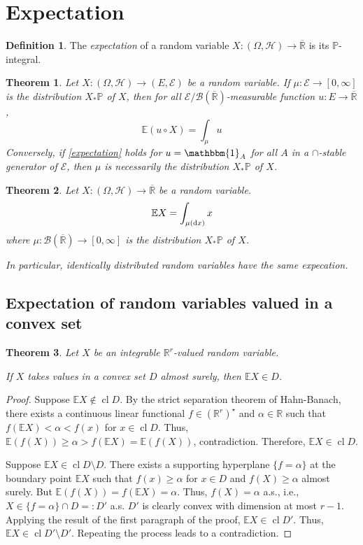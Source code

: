 \documentclass[11pt, a4paper, openany]{book}
\newtheorem{thm}{Theorem}\newtheorem{lem}{Lemma}\newtheorem{crl}{Corollary}
\theoremstyle{definition}
\newtheorem{define}{Definition}\newtheorem{exam}{Example}\newtheorem{remark}{Remark}
\DeclareMathOperator{\cl}{cl}
\newcommand{\er}{\overline{\mathbb{R}}}
\begin{document}
\section{Expectation}
    \begin{define}
        The \textit{expectation} of a random variable $X:(\Omega,\mathscr{H})\rightarrow\er$ is its $\mathbb{P}$-integral.
    \end{define}
    \begin{thm}
        Let $X:(\Omega,\mathscr{H})\rightarrow (E,\mathscr{E})$ be a random variable. If $\mu:\mathscr{E}\rightarrow [0,\infty]$ is the distribution $X_*\mathbb{P}$ of $X$, then for all $\mathscr{E}/\mathscr{B}(\er)$-measurable function $u:E\rightarrow \er$,
        \begin{equation}\label{expectation}
            \mathbb{E}(u\circ X)=\int_{\mu}u
        \end{equation}
        Conversely, if \eqref{expectation} holds for $u=\mathbbm{1}_A$ for all $A$ in a $\cap$-stable generator of $\mathscr{E}$, then $\mu$ is necessarily the distribution $X_*\mathbb{P}$ of $X$.
    \end{thm}
    \begin{thm}
        Let $X:(\Omega,\mathscr{H})\rightarrow \er$ be a random variable.
        \[
            \mathbb{E} X=\int_{\mu(\odif x)}x
        \]
        where $\mu:\mathscr{B}(\er)\rightarrow [0,\infty]$ is the distribution $X_*\mathbb{P}$ of $X$.

        In particular, identically distributed random variables have the same expecation.
    \end{thm}
\subsection{Expectation of random variables valued in a convex set}
    \begin{thm}\label{expectation of random variables valued in a convex set}
        Let $X$ be an integrable $\mathbb{R}^r$-valued random variable.

        If $X$ takes values in a convex set $D$ almost surely, then $\mathbb{E}X\in D$.
    \end{thm}
    \begin{proof}
        Suppose $\mathbb{E}X\notin \cl D$. By the strict separation theorem of Hahn-Banach, there exists a continuous linear functional $f\in(\mathbb{R}^r)^\star$ and $\alpha\in\mathbb{R}$ such that $f(\mathbb{E}X)<\alpha<f(x)$ for $x\in \cl D$. Thus, $\mathbb{E}(f(X))\geqslant \alpha>f(\mathbb{E}X)=\mathbb{E}(f(X))$, contradiction. Therefore, $\mathbb{E}X\in \cl D$.

        Suppose $\mathbb{E}X\in \cl D\setminus D$. There exists a supporting hyperplane $\{f=\alpha\}$ at the boundary point $\mathbb{E}X$ such that $f(x)\geqslant \alpha$ for $x\in D$ and $f(X)\geqslant \alpha$ almost surely. But $\mathbb{E}(f(X))=f(\mathbb{E}X)=\alpha$. Thus, $f(X)=\alpha$ a.s., i.e., $X\in\{f=\alpha\}\cap D=:D'$ a.s. $D'$ is clearly convex with dimension at most $r-1$. Applying the result of the first paragraph of the proof, $\mathbb{E}X\in \cl D'$. Thus, $\mathbb{E}X\in \cl D'\setminus D'$. Repeating the process leads to a contradiction.
    \end{proof}
\end{document}
